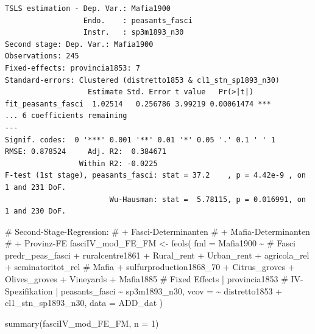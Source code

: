 \documentclass[
  a4paper,
  DIV=11,
  oneside]{scrreprt}
\newenvironment{Shaded}{\begin{snugshade}}{\end{snugshade}}
\newcommand{\AttributeTok}[1]{\textcolor[rgb]{0.40,0.45,0.13}{#1}}
\newcommand{\CommentTok}[1]{\textcolor[rgb]{0.37,0.37,0.37}{#1}}
\newcommand{\DecValTok}[1]{\textcolor[rgb]{0.68,0.00,0.00}{#1}}
\newcommand{\FunctionTok}[1]{\textcolor[rgb]{0.28,0.35,0.67}{#1}}
\newcommand{\NormalTok}[1]{\textcolor[rgb]{0.00,0.23,0.31}{#1}}
\newcommand{\OtherTok}[1]{\textcolor[rgb]{0.00,0.23,0.31}{#1}}
\newcommand{\SpecialCharTok}[1]{\textcolor[rgb]{0.37,0.37,0.37}{#1}}
\begin{document}
\begin{verbatim}
TSLS estimation - Dep. Var.: Mafia1900
                  Endo.    : peasants_fasci
                  Instr.   : sp3m1893_n30
Second stage: Dep. Var.: Mafia1900
Observations: 245
Fixed-effects: provincia1853: 7
Standard-errors: Clustered (distretto1853 & cl1_stn_sp1893_n30) 
                   Estimate Std. Error t value   Pr(>|t|)    
fit_peasants_fasci  1.02514   0.256786 3.99219 0.00061474 ***
... 6 coefficients remaining
---
Signif. codes:  0 '***' 0.001 '**' 0.01 '*' 0.05 '.' 0.1 ' ' 1
RMSE: 0.878524     Adj. R2:  0.384671
                 Within R2: -0.0225  
F-test (1st stage), peasants_fasci: stat = 37.2    , p = 4.42e-9 , on 1 and 231 DoF.
                        Wu-Hausman: stat =  5.78115, p = 0.016991, on 1 and 230 DoF.
\end{verbatim}

\begin{Shaded}
\begin{Highlighting}[]
\CommentTok{\# Second{-}Stage{-}Regression:}
\CommentTok{\# + Fasci{-}Determinanten}
\CommentTok{\# + Mafia{-}Determinanten}
\CommentTok{\# + Provinz{-}FE}
\NormalTok{fasciIV\_mod\_FE\_FM }\OtherTok{\textless{}{-}} \FunctionTok{feols}\NormalTok{(}
  \AttributeTok{fml =}\NormalTok{ Mafia1900 }\SpecialCharTok{\textasciitilde{}} 
    \CommentTok{\# Fasci}
\NormalTok{    predr\_peas\_fasci}
  \SpecialCharTok{+}\NormalTok{ ruralcentre1861}
  \SpecialCharTok{+}\NormalTok{ Rural\_rent}
  \SpecialCharTok{+}\NormalTok{ Urban\_rent}
  \SpecialCharTok{+}\NormalTok{ agricola\_rel}
  \SpecialCharTok{+}\NormalTok{ seminatoritot\_rel}
    \CommentTok{\# Mafia}
  \SpecialCharTok{+}\NormalTok{ sulfurproduction1868\_70}
  \SpecialCharTok{+}\NormalTok{ Citrus\_groves}
  \SpecialCharTok{+}\NormalTok{ Olives\_groves}
  \SpecialCharTok{+}\NormalTok{ Vineyards}
  \SpecialCharTok{+}\NormalTok{ Mafia1885}
    \CommentTok{\# Fixed Effects}
  \SpecialCharTok{|}\NormalTok{ provincia1853 }
    \CommentTok{\# IV{-}Spezifikation}
  \SpecialCharTok{|}\NormalTok{ peasants\_fasci }\SpecialCharTok{\textasciitilde{}}\NormalTok{ sp3m1893\_n30,}
  \AttributeTok{vcov =} \SpecialCharTok{\textasciitilde{}}\NormalTok{ distretto1853 }\SpecialCharTok{+}\NormalTok{ cl1\_stn\_sp1893\_n30,}
  \AttributeTok{data =}\NormalTok{ ADD\_dat}
\NormalTok{) }

\FunctionTok{summary}\NormalTok{(fasciIV\_mod\_FE\_FM, }\AttributeTok{n =} \DecValTok{1}\NormalTok{)}
\end{Highlighting}
\end{Shaded}
\end{document}
